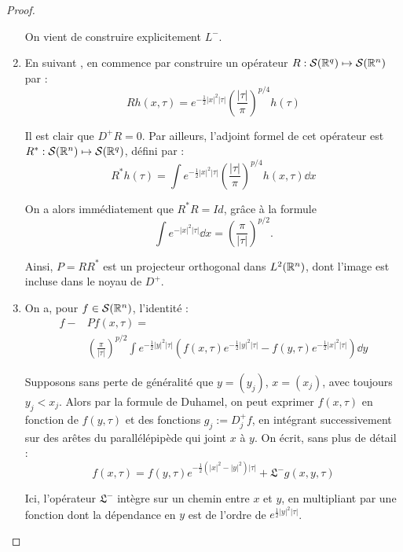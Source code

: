 \begin{proof}
\begin{enumerate}
  On vient de construire explicitement $L^-$.
  
  \item En suivant \cite{BoutetdeMonvel1975}, en commence par construire un opérateur $R : \mathcal{S}(\mathbb{R}^q) \mapsto \mathcal{S}(\mathbb{R}^n)$ par :
  \begin{equation*}
    Rh(x,\tau) = e^{-\frac 12 |x|^2 |\tau|}\left(\frac{|\tau|}{\pi}\right)^{p/4}h(\tau)
  \end{equation*}
  
  Il est clair que $D^+R=0$. Par ailleurs, l'adjoint formel de cet opérateur est $R^* : \mathcal{S}(\mathbb{R}^n) \mapsto \mathcal{S}(\mathbb{R}^q)$, défini par :
  \begin{equation*}
    R^*h(\tau) = \int e^{-\frac 12 |x|^2
      |\tau|}\left(\frac{|\tau|}{\pi}\right)^{p/4}h(x,\tau)\dd x
  \end{equation*}
  
  On a alors immédiatement que $R^*R=Id$, grâce à la formule
  \begin{equation*}
    \int e^{-|x|^2|\tau|}\dd x = \left(\frac{\pi}{|\tau|}\right)^{p/2}.
  \end{equation*}
  
   Ainsi, $P=RR^*$ est un projecteur orthogonal dans $L^2(\mathbb{R}^n)$, dont l'image est incluse dans le noyau de $D^+$.
  
  \item On a, pour $f \in \mathcal{S}(\mathbb{R}^n)$, l'identité :
  \begin{equation*}
  \begin{split}
    f-&Pf(x,\tau) = \\ &\left(\frac{\pi}{|\tau|}\right)^{p/2}\int
    e^{-\frac 12 |y|^2 |\tau|}\left(f(x,\tau)e^{-\frac 12 |y|^2|\tau|}
      - f(y,\tau)e^{-\frac 12 |x|^2|\tau|}\right)\dd y
    \end{split}
  \end{equation*}
  
  Supposons sans perte de généralité que $y=(y_j)$, $x=(x_j)$, avec toujours $y_j < x_j$. Alors par la formule de Duhamel, on peut exprimer $f(x,\tau)$ en fonction de $f(y,\tau)$ et des fonctions $g_j := D^+_j f$, en intégrant successivement sur des arêtes du parallélépipède qui joint $x$ à $y$. On écrit, sans plus de détail :
  \begin{equation*}
    f(x,\tau)=f(y,\tau)e^{-\frac 12 (|x|^2-|y|^2)|\tau|} + \mathfrak{L}^- g (x,y,\tau)
  \end{equation*}
  
  Ici, l'opérateur $\mathfrak{L}^-$ intègre sur un chemin entre $x$ et $y$, en multipliant par une fonction dont la dépendance en $y$ est de l'ordre de $e^{\frac 12 |y|^2|\tau|}$.
  

\end{enumerate}
\end{proof}

